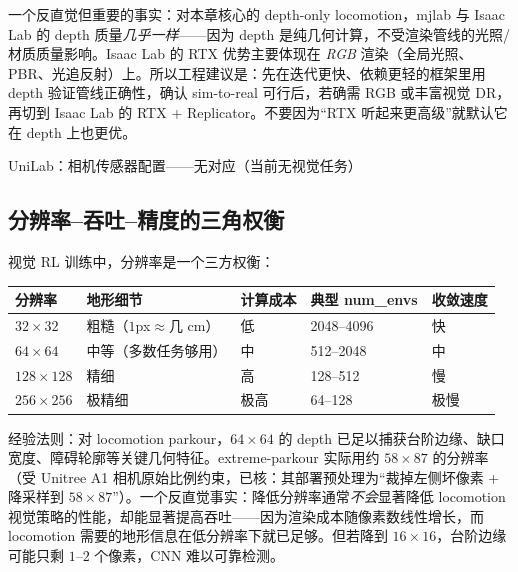 \begin{insight}\label{ins:rlmc-vm-depthsame}
一个反直觉但重要的事实：对本章核心的 depth-only locomotion，mjlab 与 Isaac Lab 的 depth 质量\emph{几乎一样}——因为 depth 是纯几何计算，不受渲染管线的光照/材质质量影响。Isaac Lab 的 RTX 优势主要体现在 \emph{RGB} 渲染（全局光照、PBR、光追反射）上。所以工程建议是：先在迭代更快、依赖更轻的框架里用 depth 验证管线正确性，确认 sim-to-real 可行后，若确需 RGB 或丰富视觉 DR，再切到 Isaac Lab 的 RTX + Replicator。不要因为“RTX 听起来更高级”就默认它在 depth 上也更优。
\end{insight}

\begin{codebox}[text]{UniLab：相机传感器配置——无对应（当前无视觉任务）}
\end{codebox}

\subsection{分辨率--吞吐--精度的三角权衡}
\label{sec:rlmc-vm-resolution}

视觉 RL 训练中，分辨率是一个三方权衡：

\begin{center}
\small
\begin{tabular}{@{}lllll@{}}
\toprule
分辨率 & 地形细节 & 计算成本 & 典型 num\_envs & 收敛速度 \\
\midrule
$32\times32$ & 粗糙（$1$px$\approx$几 cm） & 低 & 2048--4096 & 快 \\
$64\times64$ & 中等（多数任务够用） & 中 & 512--2048 & 中 \\
$128\times128$ & 精细 & 高 & 128--512 & 慢 \\
$256\times256$ & 极精细 & 极高 & 64--128 & 极慢 \\
\bottomrule
\end{tabular}
\end{center}

经验法则：对 locomotion parkour，$64\times64$ 的 depth 已足以捕获台阶边缘、缺口宽度、障碍轮廓等关键几何特征。extreme-parkour 实际用约 $58\times87$ 的分辨率（受 Unitree A1 相机原始比例约束，已核：其部署预处理为“裁掉左侧坏像素 + 降采样到 $58\times87$”）。一个反直觉事实：降低分辨率通常\emph{不会}显著降低 locomotion 视觉策略的性能，却能显著提高吞吐——因为渲染成本随像素数线性增长，而 locomotion 需要的地形信息在低分辨率下就已足够。但若降到 $16\times16$，台阶边缘可能只剩 $1$--$2$ 个像素，CNN 难以可靠检测。

